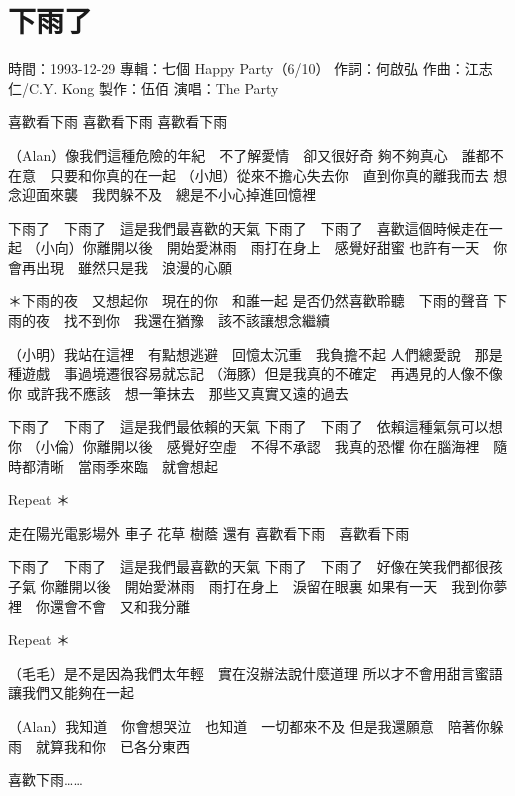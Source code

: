 \documentclass[UTF8,a4paper,oneside,twocolumn,12pt]{ctexbook}
\newcommand{\infopair}[2]{\textbullet #1：#2}
\newcommand{\zc}[1][伍佰]{\infopair{作詞}{#1}}
\newcommand{\zq}[1][伍佰]{\infopair{作曲}{#1}}
\newcommand{\zj}[1]{\infopair{專輯}{#1}}
\newcommand{\zz}[1]{\infopair{製作}{#1}}
\newcommand{\sj}[1]{\infopair{時間}{#1}}
\newenvironment{info}{\begin{flushleft}\kaishu
	}
	{\end{flushleft}\normalsize\yahei\par}
\newenvironment{lyric}{
	}
{}
\begin{document}
\section{下雨了}
\begin{info}
	\sj{1993-12-29}
	\zj{七個 Happy Party（6/10）}
	\zc[何啟弘]
	\zq[江志仁/C.Y. Kong]
	\zz{伍佰}
	\infopair{演唱}{The Party}
\end{info}
\begin{lyric}
	喜歡看下雨 喜歡看下雨 喜歡看下雨

	（Alan）像我們這種危險的年紀　不了解愛情　卻又很好奇
	夠不夠真心　誰都不在意　只要和你真的在一起
	（小旭）從來不擔心失去你　直到你真的離我而去
	想念迎面來襲　我閃躲不及　總是不小心掉進回憶裡

	下雨了　下雨了　這是我們最喜歡的天氣
	下雨了　下雨了　喜歡這個時候走在一起
	（小向）你離開以後　開始愛淋雨　雨打在身上　感覺好甜蜜
	也許有一天　你會再出現　雖然只是我　浪漫的心願

	＊下雨的夜　又想起你　現在的你　和誰一起
	是否仍然喜歡聆聽　下雨的聲音
	下雨的夜　找不到你　我還在猶豫　該不該讓想念繼續

	（小明）我站在這裡　有點想逃避　回憶太沉重　我負擔不起
	人們總愛說　那是種遊戲　事過境遷很容易就忘記
	（海豚）但是我真的不確定　再遇見的人像不像你
	或許我不應該　想一筆抹去　那些又真實又遠的過去

	下雨了　下雨了　這是我們最依賴的天氣
	下雨了　下雨了　依賴這種氣氛可以想你
	（小倫）你離開以後　感覺好空虛　不得不承認　我真的恐懼
	你在腦海裡　隨時都清晰　當雨季來臨　就會想起

	Repeat ＊

	走在陽光電影場外 車子 花草 樹蔭 還有
	喜歡看下雨　喜歡看下雨

	下雨了　下雨了　這是我們最喜歡的天氣
	下雨了　下雨了　好像在笑我們都很孩子氣
	你離開以後　開始愛淋雨　雨打在身上　淚留在眼裏
	如果有一天　我到你夢裡　你還會不會　又和我分離

	Repeat ＊

	（毛毛）是不是因為我們太年輕　實在沒辦法說什麼道理
	所以才不會用甜言蜜語　讓我們又能夠在一起

	（Alan）我知道　你會想哭泣　也知道　一切都來不及
	但是我還願意　陪著你躲雨　就算我和你　已各分東西

	喜歡下雨……
\end{lyric}
\end{document}
